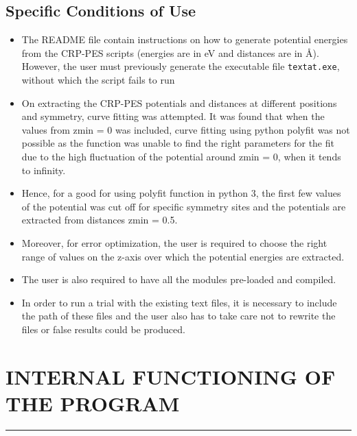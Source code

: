 \documentclass[12pt]{article}
\newcommand{\code}[1]{\colorbox{gray!18}{\texttt{#1}}}
\begin{document}
\subsection{Specific Conditions of Use}
\vspace{5mm}
\begin{itemize}

    \item The README file contain instructions on how to generate potential energies from the CRP-PES scripts (energies are in eV and distances are in \AA). However, the user must previously generate the executable file  {\fontsize{10}{6}\code{textat.exe}}, without which the script fails to run
    
    \item On extracting the CRP-PES potentials and distances at different positions and symmetry, curve fitting was attempted. It was found that when the values from zmin = 0 was included, curve fitting using python polyfit was not possible as the function was unable to find the right parameters for the fit due to the high fluctuation of the potential around zmin = 0, when it tends to infinity. 
    
     \item Hence, for a good for using polyfit function in python 3, the first few values of the potential was cut off for specific symmetry sites and the potentials are  extracted from distances zmin = 0.5.
    
    \item Moreover, for error optimization, the user is required to choose the right range of values on the z-axis over which the potential energies are extracted. 

    \item The user is also required to have all the modules pre-loaded and compiled.
    
    \item In order to run a trial with the existing text files, it is necessary to include the path of these files and the user also has to take care not to rewrite the files or false results could be produced. 
    
\end{itemize}


\section{INTERNAL FUNCTIONING OF THE PROGRAM}
\par\noindent\rule{\textwidth}{0.4pt}
\end{document}
